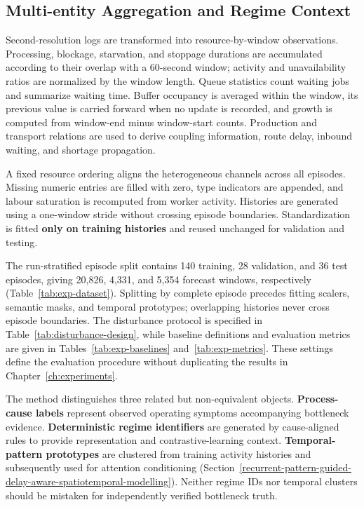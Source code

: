\subsection{Multi-entity Aggregation and Regime Context}\label{multi-entity-aggregation-and-regime-context}

Second-resolution logs are transformed into resource-by-window observations. Processing, blockage, starvation, and stoppage durations are accumulated according to their overlap with a 60-second window; activity and unavailability ratios are normalized by the window length. Queue statistics count waiting jobs and summarize waiting time. Buffer occupancy is averaged within the window, its previous value is carried forward when no update is recorded, and growth is computed from window-end minus window-start counts. Production and transport relations are used to derive coupling information, route delay, inbound waiting, and shortage propagation.

A fixed resource ordering aligns the heterogeneous channels across all episodes. Missing numeric entries are filled with zero, type indicators are appended, and labour saturation is recomputed from worker activity. Histories are generated using a one-window stride without crossing episode boundaries. Standardization is fitted \textbf{only on training histories} and reused unchanged for validation and testing.

The run-stratified episode split contains 140 training, 28 validation, and 36 test episodes, giving 20,826, 4,331, and 5,354 forecast windows, respectively (Table~\ref{tab:exp-dataset}). Splitting by complete episode precedes fitting scalers, semantic masks, and temporal prototypes; overlapping histories never cross episode boundaries. The disturbance protocol is specified in Table~\ref{tab:disturbance-design}, while baseline definitions and evaluation metrics are given in Tables~\ref{tab:exp-baselines} and~\ref{tab:exp-metrics}. These settings define the evaluation procedure without duplicating the results in Chapter~\ref{ch:experiments}.

The method distinguishes three related but non-equivalent objects. \textbf{Process-cause labels} represent observed operating symptoms accompanying bottleneck evidence. \textbf{Deterministic regime identifiers} are generated by cause-aligned rules to provide representation and contrastive-learning context. \textbf{Temporal-pattern prototypes} are clustered from training activity histories and subsequently used for attention conditioning (Section~\ref{recurrent-pattern-guided-delay-aware-spatiotemporal-modelling}). Neither regime IDs nor temporal clusters should be mistaken for independently verified bottleneck truth.

